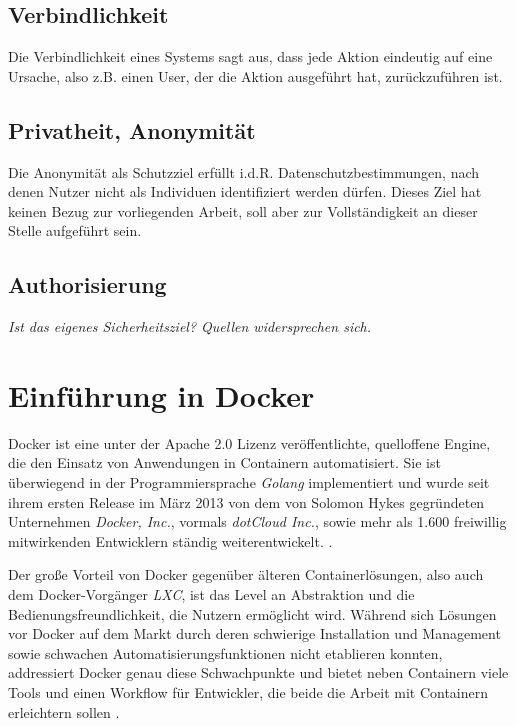 \documentclass[../main.tex]{subfiles}
\begin{document}
    \subsection{Verbindlichkeit}
			Die Verbindlichkeit eines Systems sagt aus, dass jede Aktion eindeutig auf eine Ursache, also z.B. einen User, der die Aktion ausgeführt hat, zurückzuführen ist.
		\subsection{Privatheit, Anonymität}
			Die Anonymität als Schutzziel erfüllt i.d.R. Datenschutzbestimmungen, nach denen Nutzer nicht als Individuen identifiziert werden dürfen. Dieses Ziel hat keinen Bezug zur vorliegenden Arbeit, soll aber zur Vollständigkeit an dieser Stelle aufgeführt sein.
    \subsection{Authorisierung}
      \emph{Ist das eigenes Sicherheitsziel? Quellen widersprechen sich.}

  \section{Einführung in Docker}
  \label{dockerIntro}
    Docker ist eine unter der Apache 2.0 Lizenz veröffentlichte, quelloffene Engine, die den Einsatz von Anwendungen in Containern automatisiert. Sie ist überwiegend in der Programmiersprache \emph{Golang} implementiert und wurde seit ihrem ersten Release im März 2013 von dem von Solomon Hykes gegründeten Unternehmen \emph{Docker, Inc.}\cite{dockerHykes}, vormals \emph{dotCloud Inc.}, sowie mehr als 1.600 freiwillig mitwirkenden Entwicklern ständig weiterentwickelt. \cite{githubDocker}\cite[S.7]{dockerBook}\cite{githubDockerChangelog}\cite{dockerCompany}.




    Der große Vorteil von Docker gegenüber älteren Containerlösungen, also auch dem Docker-Vorgänger \emph{LXC}, ist das Level an Abstraktion und die Bedienungsfreundlichkeit, die Nutzern ermöglicht wird. Während sich Lösungen vor Docker auf dem Markt durch deren schwierige Installation und Management sowie schwachen Automatisierungsfunktionen nicht etablieren konnten, addressiert Docker genau diese Schwachpunkte \cite[S.7]{dockerBook} und bietet neben Containern viele Tools und einen Workflow für Entwickler, die beide die Arbeit mit Containern erleichtern sollen \cite[S.1]{dockerIntroIEEE}.
\end{document}
